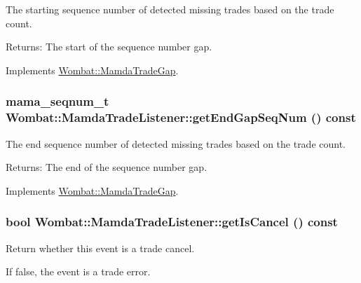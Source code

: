 The starting sequence number of detected missing trades based on the trade count. 

\begin{Desc}
\item[Returns:]The start of the sequence number gap. \end{Desc}


Implements \hyperlink{classWombat_1_1MamdaTradeGap_1b3619649178e414cbee977c9f16d125}{Wombat::Mamda\-Trade\-Gap}.\hypertarget{classWombat_1_1MamdaTradeListener_44737862aaa29034fd1b42173dae3a5d}{
\subsubsection[getEndGapSeqNum]{\setlength{\rightskip}{0pt plus 5cm}mama\_\-seqnum\_\-t Wombat::Mamda\-Trade\-Listener::get\-End\-Gap\-Seq\-Num () const}}
\label{classWombat_1_1MamdaTradeListener_44737862aaa29034fd1b42173dae3a5d}


The end sequence number of detected missing trades based on the trade count. 

\begin{Desc}
\item[Returns:]The end of the sequence number gap. \end{Desc}


Implements \hyperlink{classWombat_1_1MamdaTradeGap_585fad255869d86be104a783d14987ca}{Wombat::Mamda\-Trade\-Gap}.\hypertarget{classWombat_1_1MamdaTradeListener_d27b9e42599cbf198fbaf59df252a708}{
\subsubsection[getIsCancel]{\setlength{\rightskip}{0pt plus 5cm}bool Wombat::Mamda\-Trade\-Listener::get\-Is\-Cancel () const}}
\label{classWombat_1_1MamdaTradeListener_d27b9e42599cbf198fbaf59df252a708}


Return whether this event is a trade cancel. 

If false, the event is a trade error.

